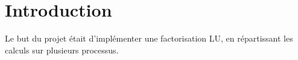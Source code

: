 \section{Introduction} %
\label{sec:introduction}
Le but du projet était d'implémenter une factorisation LU, en répartissant les calculs sur plusieurs processus. 

